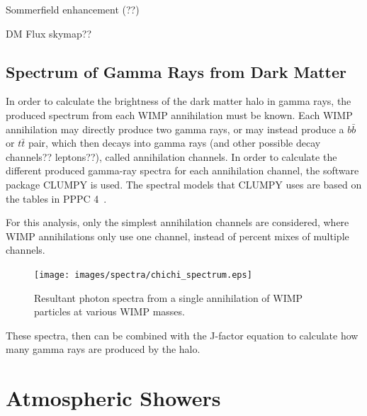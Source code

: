     {\color{red}Sommerfield enhancement (??)}

    
    {\color{red}DM Flux skymap??}
    
  \subsection{Spectrum of Gamma Rays from Dark Matter}\label{dm_spectral}
    In order to calculate the brightness of the dark matter halo in gamma rays, the produced spectrum from each WIMP annihilation must be known.
    Each WIMP annihilation may directly produce two gamma rays, or may instead produce a $b\bar{b}$  or $t\bar{t}$ pair, which then decays into gamma rays {\color{red}(and other possible decay channels?? leptons??)}, called annihilation channels.
    In order to calculate the different produced gamma-ray spectra for each annihilation channel, the software package CLUMPY \cite{CLUMPYcode} is used.
    The spectral models that CLUMPY uses are based on the tables in PPPC 4~\cite{pppc4_dm_spectra}.

    For this analysis, only the simplest annihilation channels are considered, where WIMP annihilations only use one channel, instead of percent mixes of multiple channels.

    \begin{figure}[ht]
      \centering
      \texttt{[image: images/spectra/chichi\_spectrum.eps]}
      \caption[Single Annihilation Spectra]{
        Resultant photon spectra from a single annihilation of WIMP particles at various WIMP masses.}
      \label{fig:chichi_spectrum}
    \end{figure}

    These spectra, then can be combined with the J-factor equation to calculate how many gamma rays are produced by the halo.

    \FloatBarrier
    
    
\section{Atmospheric Showers}

